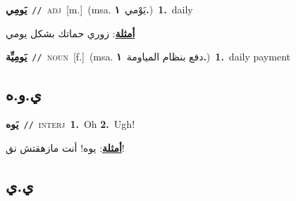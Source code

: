 \documentclass[10pt,a4paper,twoside]{article} %
\begin{document}
\begin{multicols}{2}
{\setlength\topsep{0pt}\textbf{\foreignlanguage{arabic}{يَومِي}}\ {\color{gray}\texttt{//}\color{black}}\ \textsc{adj}\ [m.]\ \color{gray}(msa. \foreignlanguage{arabic}{يَوْمي}~\foreignlanguage{arabic}{\textbf{١.}})\color{black}\ \textbf{1.}~daily\  \begin{flushright}\color{gray}\foreignlanguage{arabic}{\textbf{\underline{\foreignlanguage{arabic}{أمثلة}}}: زوري حماتك بشكل يومي}\end{flushright}\color{black}} \vspace{2mm}

{\setlength\topsep{0pt}\textbf{\foreignlanguage{arabic}{يَومِيِّة}}\ {\color{gray}\texttt{//}\color{black}}\ \textsc{noun}\ [f.]\ \color{gray}(msa. \foreignlanguage{arabic}{دفع بنظام المياومة}~\foreignlanguage{arabic}{\textbf{١.}})\color{black}\ \textbf{1.}~daily payment\ } \vspace{2mm}

\vspace{-3mm}
\subsection*{\color{blue}\foreignlanguage{arabic}{ي.و.ه}\color{blue}{ (ntws)}} 

{\setlength\topsep{0pt}\textbf{\foreignlanguage{arabic}{يَوه}}\ {\color{gray}\texttt{//}\color{black}}\ \textsc{interj}\ \textbf{1.}~Oh  \textbf{2.}~Ugh!\  \begin{flushright}\color{gray}\foreignlanguage{arabic}{\textbf{\underline{\foreignlanguage{arabic}{أمثلة}}}: يوه! أنت مازهقتش نق!}\end{flushright}\color{black}} \vspace{2mm}

\vspace{-3mm}
\subsection*{\color{blue}\foreignlanguage{arabic}{ي.ي}\color{blue}{ (ntws)}} 


\end{multicols}
\end{document}
